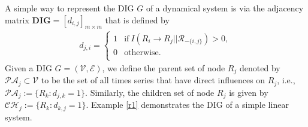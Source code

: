 A simple way to represent the DIG $G$ of a dynamical system is via the adjacency matrix $\textbf{DIG}=[d_{i,j}]_{m\times m}$ that is defined by
\begin{align}
    d_{j,i} = \left\{
\begin{array}{ll}
      1 & \text{if}\  I(R_i\rightarrow R_j||\mathcal{R}_{-\{i,j\}})>0,\\
      0 & \text{otherwise}. \\
\end{array} 
\right. 
\end{align}
Given a DIG $G=(\mathcal{V},\mathcal{E})$, we define the parent set of node $R_j$ denoted by $\mathcal{PA}_j\subset \mathcal{V}$ to be the set of all times series that have direct influences on $R_j$, i.e., $\mathcal{PA}_j:=\{R_k: d_{j,k}=1\}$. Similarly, the children set of node $R_j$ is given by $\mathcal{CH}_j:=\{R_k: d_{k,j}=1\}$. 
Example \ref{r1} demonstrates the DIG of a simple linear system.

\clearpage

